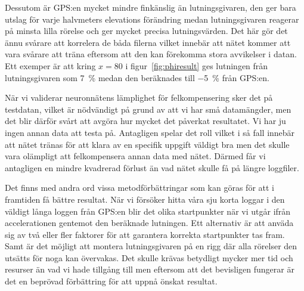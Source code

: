 {Dessutom är GPS:en mycket mindre finkänslig än lutningsgivaren, den ger bara
utslag för varje halvmeters elevations förändring medan lutningsgivaren reagerar
på minsta lilla rörelse och ger mycket precisa lutningsvärden.
Det här gör det ännu svårare att korrelera de båda filerna vilket innebär att
nätet kommer att vara svårare att träna eftersom att den kan förekomma stora
avvikelser i datan.
Ett exemper är att kring $x = 80$ i figur~\ref{fig:phiresult} ges
lutningen från lutningsgivaren som \SI{7}{\percent} medan den beräknades till
\SI{-5}{\percent} från GPS:en.

När vi validerar neuronnätens lämplighet för felkompensering sker det på testdatan,
vilket är nödvändigt på grund av att vi har små datamängder, men det blir därför
svårt att avgöra hur mycket det påverkat resultatet.
Vi har ju ingen annan data att testa på.
Antagligen spelar det roll vilket i så fall innebär att nätet tränas för att
klara av en specifik uppgift väldigt bra men det skulle vara olämpligt att
felkompensera annan data med nätet.
Därmed får vi antagligen en mindre kvadrerad förlust än vad nätet skulle få på
längre loggfiler.

Det finns med andra ord vissa metodförbättringar som kan göras för att i
framtiden få bättre resultat.
När vi försöker hitta våra sju korta loggar i den väldigt långa loggen från
GPS:en blir det olika startpunkter när vi utgår ifrån accelerationen
gentemot den beräknade lutningen.
Ett alternativ är att anväda sig av två eller fler faktorer för
att garantera korrekta startpunkter tas fram.
Samt är det möjligt att montera lutningsgivaren på en rigg där alla rörelser
den utsätts för noga kan övervakas. Det skulle krävas betydligt mycker mer tid
och resurser än vad vi hade tillgång till men eftersom att det bevisligen
fungerar är det en beprövad förbättring för att uppnå önskat resultat.
}
